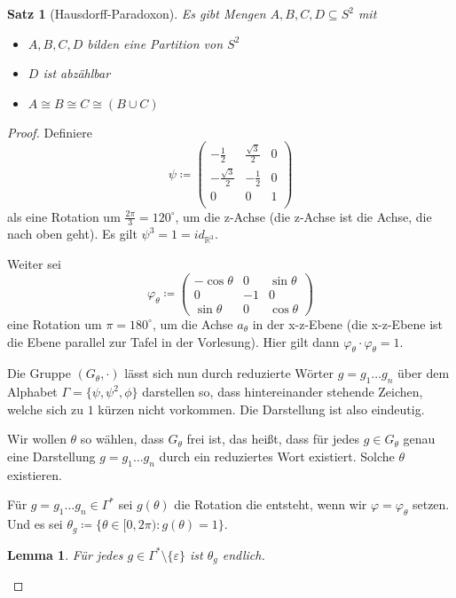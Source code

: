 \documentclass[german]{article}
\theoremstyle{break}
\theoremstyle{def_style}
\theoremstyle{def_style}
\newtheorem{satz}{Satz}[section]
\theoremstyle{lemma_style}
\newtheorem{lemma}{Lemma}[subsection]
\begin{document}
\begin{satz}[Hausdorff-Paradoxon]
	Es gibt Mengen $A,B,C,D\subseteq S^2$ mit
	\begin{itemize}
		\item $A,B,C,D$ bilden eine Partition von $S^2$
		\item $D$ ist abzählbar
		\item $A\cong B \cong C \cong (B\cup C)$
	\end{itemize}
\end{satz}
\begin{proof}
	Definiere
	$$
	\psi\coloneqq
	\begin{pmatrix}
		-\frac{1}{2} & \frac{\sqrt{3}}{2} & 0 \\
		-\frac{\sqrt{3}}{2} & -\frac{1}{2} & 0 \\
		0 & 0 & 1 \\
	\end{pmatrix}
	$$
	als eine Rotation um $\frac{2\pi}{3}=120^\circ$, um die z-Achse (die z-Achse ist die Achse, die nach \glqq oben\grqq{} geht). Es gilt $\psi^3=1=id_{\mathbb{R}^3}$.
		
	Weiter sei 
	$$
	\varphi_\theta\coloneqq
	\begin{pmatrix}
		-\cos \theta & 0 & \sin \theta \\
		0 & -1 & 0 \\
		\sin \theta & 0 & \cos \theta 
	\end{pmatrix}
	$$
	eine Rotation um $\pi=180^\circ$, um die Achse $a_\theta$ in der x-z-Ebene (die x-z-Ebene ist die Ebene parallel zur Tafel in der Vorlesung). Hier gilt dann $\varphi_\theta\cdot\varphi_\theta=1$.
	
	Die Gruppe $(G_\theta, \cdot)$ lässt sich nun durch reduzierte Wörter $g=g_1\dots g_n$ über dem Alphabet $\Gamma=\{\psi, \psi^2,\phi\}$ darstellen so, dass hintereinander stehende Zeichen, welche sich zu $1$ kürzen nicht vorkommen. Die Darstellung ist also eindeutig.
	
	Wir wollen $\theta$ so wählen, dass $G_\theta$ frei ist, das heißt, dass für jedes $g\in G_\theta$ genau eine Darstellung $g=g_1\dots g_n$ durch ein reduziertes Wort existiert. Solche $\theta$ existieren.
	
	Für $g=g_1\dots g_n\in \Gamma^\ast$ sei $g(\theta)$ die Rotation die entsteht, wenn wir $\varphi=\varphi_\theta$ setzen. Und es sei $\theta_g\coloneqq\{\theta\in[0,2\pi) : g(\theta)=1\}$.
	
	\begin{lemma}
		Für jedes $g\in\Gamma^\ast\setminus\{\varepsilon\}$ ist $\theta_g$ endlich.
		\label{HausdorffOhneProof}
	\end{lemma}


\end{proof}
\end{document}
